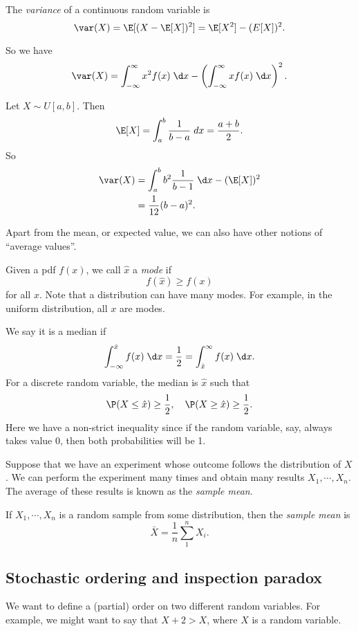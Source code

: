 \documentclass[a4paper]{article}
\begin{document}
\begin{defi}[Variance]
  The \emph{variance} of a continuous random variable is
  \[
    \var (X) = \E[(X - \E[X])^2] = \E[X^2] - (E[X])^2.
  \]
\end{defi}
So we have
\[
  \var (X) = \int_{-\infty}^\infty x^2 f(x) \;\d x - \left(\int_{-\infty}^\infty xf(x)\;\d x\right)^2.
\]
\begin{eg}
  Let $X\sim U[a, b]$. Then
  \[
    \E[X] = \int_a^b \frac{1}{b - a}\;d x = \frac{a + b}{2}.
  \]
  So
  \begin{align*}
    \var (X) &= \int_a^b b^2\frac{1}{b - 1}\;\d x - (\E[X])^2\\
    &= \frac{1}{12}(b - a)^2.
  \end{align*}
\end{eg}

Apart from the mean, or expected value, we can also have other notions of ``average values''.
\begin{defi}
  Given a pdf $f(x)$, we call $\hat x$ a \emph{mode} if
  \[
    f(\hat x) \geq f(x)
  \]
  for all $x$. Note that a distribution can have many modes. For example, in the uniform distribution, all $x$ are modes.

  We say it is a median if
  \[
    \int_{-\infty}^{\hat x}f(x)\;\d x = \frac{1}{2} = \int_{\hat x}^\infty f(x)\;\d x.
  \]
  For a discrete random variable, the median is $\hat x$ such that
  \[
    \P(X \leq \hat x) \geq \frac{1}{2}, \quad \P(X \geq \hat x) \geq \frac{1}{2}.
  \]
  Here we have a non-strict inequality since if the random variable, say, always takes value $0$, then both probabilities will be 1.
\end{defi}

Suppose that we have an experiment whose outcome follows the distribution of $X$. We can perform the experiment many times and obtain many results $X_1, \cdots, X_n$. The average of these results is known as the \emph{sample mean}.

\begin{defi}
  If $X_1, \cdots, X_n$ is a random sample from some distribution, then the \emph{sample mean} is
  \[
    \bar X = \frac{1}{n}\sum_1^n X_i.
  \]
\end{defi}

\subsection{Stochastic ordering and inspection paradox}
We want to define a (partial) order on two different random variables. For example, we might want to say that $X + 2 > X$, where $X$ is a random variable.
\end{document}
